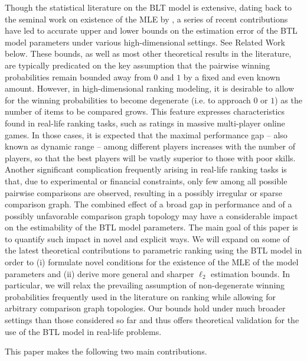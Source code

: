 Though the statistical literature on the BLT model is extensive, dating back to the seminal work on existence of the MLE by \cite{ford1957solution}, a series of recent contributions have led to accurate upper and lower bounds on the estimation error of the BTL model parameters under various high-dimensional settings. See Related Work below. These bounds, as well as most other theoretical results in the literature, are typically predicated on the key assumption that the pairwise winning probabilities remain bounded away from $0$ and $1$ by a fixed and even  known amount. However, in high-dimensional ranking modeling, it is desirable to allow for the winning probabilities to become degenerate (i.e. to approach $0$ or $1$)  as the number of items to be compared grows. This feature expresses characteristics found in real-life ranking tasks, such as ratings in massive multi-player online games. In those cases, it is  expected that the maximal performance gap -- also known as dynamic range -- among different players increases with the number of players, so that the best players will be vastly superior to those with poor skills. Another significant complication frequently arising in real-life ranking tasks is that,  due to experimental  or financial constraints, only few among all possible pairwise comparisons are observed, resulting in a possibly irregular or sparse comparison graph. The combined effect of a broad gap in performance and of a possibly unfavorable comparison graph topology may have a considerable impact on the estimability of the BTL model parameters. The main goal of this paper  is to quantify such impact in novel and explicit ways.  We will expand on some of the latest theoretical contributions to parametric ranking using the BTL model in order to (i) formulate novel conditions for the existence of the MLE of the model parameters and (ii) derive more general and sharper $\ell_2$ estimation bounds. In particular, we will relax the prevailing assumption of non-degenerate winning probabilities frequently used in the literature on ranking while allowing for arbitrary comparison graph topologies. Our bounds hold under much broader settings than those considered so far and thus offers theoretical validation for the use of the BTL model in  real-life problems.  

This paper makes the following two main contributions.

